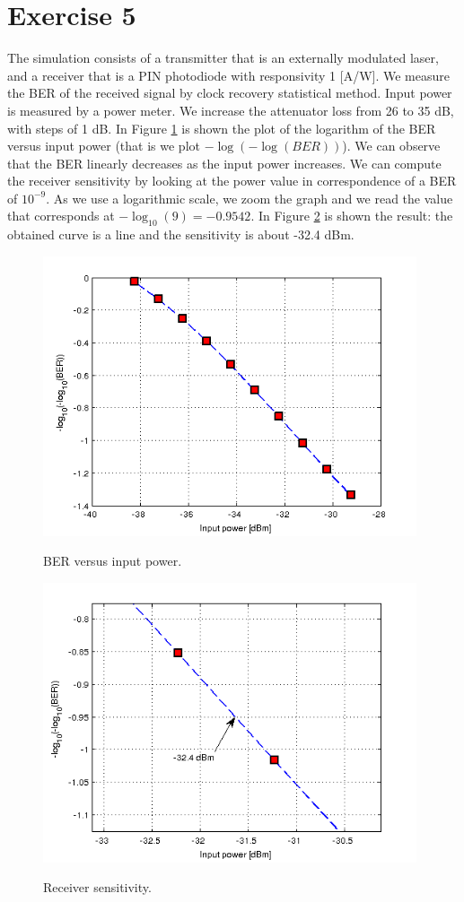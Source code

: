 \documentclass[a4paper,10pt]{report}
\begin{document}
\newpage
\section*{Exercise 5}
The simulation consists of a transmitter that is an externally modulated laser, and a receiver that is a PIN photodiode with responsivity 1 [A/W].
We measure the BER of the received signal by clock recovery statistical method. Input power is measured by a power meter.
We increase the attenuator loss from 26 to 35 dB, with steps of 1 dB. In Figure \ref{ex5_1} is shown the plot of the logarithm
of the BER versus input power (that is we plot $-\log(-\log(BER))$).
We can observe that the BER linearly decreases as the input power increases.
We can compute the receiver sensitivity by looking at the power value in correspondence of a BER of $10^{-9}$. As we use a logarithmic scale,
we zoom the graph and we read the value that corresponds at $-\log_{10}(9)=-0.9542$.
In Figure \ref{ex5_2} is shown the result: the obtained curve is a line and the sensitivity is about -32.4 dBm.

\begin{figure}[!ht]
   \centering
   \includegraphics[width=11cm]{ex5_1.png}\\
   \caption{BER versus input power.}
   \label{ex5_1}
\end{figure}

\begin{figure}[!ht]
   \centering
   \includegraphics[width=11cm]{ex5_2.png}\\
   \caption{Receiver sensitivity.}
   \label{ex5_2}
\end{figure}
\end{document}
